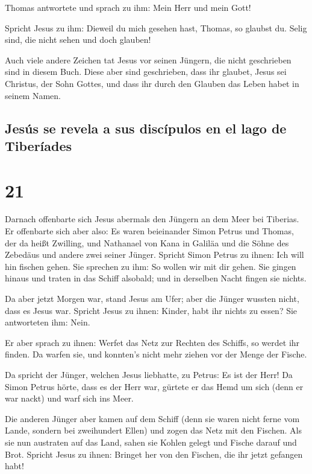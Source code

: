  Thomas antwortete und sprach zu ihm: Mein Herr und mein
Gott!

 Spricht Jesus zu ihm: Dieweil du mich gesehen hast,
Thomas, so glaubst du. Selig sind, die nicht sehen und doch glauben!

 Auch viele andere Zeichen tat Jesus vor seinen Jüngern,
die nicht geschrieben sind in diesem Buch.  Diese aber
sind geschrieben, dass ihr glaubet, Jesus sei Christus, der Sohn Gottes,
und dass ihr durch den Glauben das Leben habet in seinem Namen.

\hypertarget{jesuxfas-se-revela-a-sus-discuxedpulos-en-el-lago-de-tiberuxedades}{%
\subsection{Jesús se revela a sus discípulos en el lago de
Tiberíades}\label{jesuxfas-se-revela-a-sus-discuxedpulos-en-el-lago-de-tiberuxedades}}

\hypertarget{section-20}{%
\section{21}\label{section-20}}

 Darnach offenbarte sich Jesus abermals den Jüngern an dem
Meer bei Tiberias. Er offenbarte sich aber also:  Es waren
beieinander Simon Petrus und Thomas, der da heißt Zwilling, und
Nathanael von Kana in Galiläa und die Söhne des Zebedäus und andere zwei
seiner Jünger.  Spricht Simon Petrus zu ihnen: Ich will
hin fischen gehen. Sie sprechen zu ihm: So wollen wir mit dir gehen. Sie
gingen hinaus und traten in das Schiff alsobald; und in derselben Nacht
fingen sie nichts.

 Da aber jetzt Morgen war, stand Jesus am Ufer; aber die
Jünger wussten nicht, dass es Jesus war.  Spricht Jesus zu
ihnen: Kinder, habt ihr nichts zu essen? Sie antworteten ihm: Nein.

 Er aber sprach zu ihnen: Werfet das Netz zur Rechten des
Schiffs, so werdet ihr finden. Da warfen sie, und konnten's nicht mehr
ziehen vor der Menge der Fische.

 Da spricht der Jünger, welchen Jesus liebhatte, zu
Petrus: Es ist der Herr! Da Simon Petrus hörte, dass es der Herr war,
gürtete er das Hemd um sich (denn er war nackt) und warf sich ins Meer.

 Die anderen Jünger aber kamen auf dem Schiff (denn sie
waren nicht ferne vom Lande, sondern bei zweihundert Ellen) und zogen
das Netz mit den Fischen.  Als sie nun austraten auf das
Land, sahen sie Kohlen gelegt und Fische darauf und Brot.
 Spricht Jesus zu ihnen: Bringet her von den Fischen, die
ihr jetzt gefangen habt!

